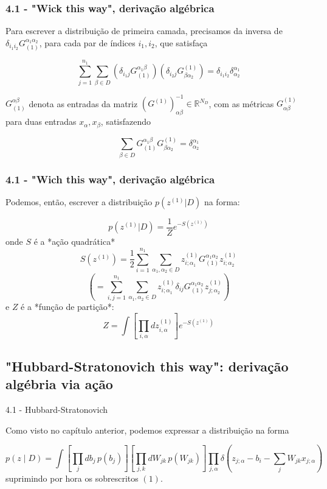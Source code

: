 \documentclass{beamer}
\begin{document}
\begin{frame}
    \frametitle{4.1 - "Wick this way", derivação algébrica}

    Para escrever a distribuição de primeira camada, precisamos da inversa de  $\delta_{i_1i_2}G_{(1)}^{\alpha_1\alpha_2}$, para cada par de índices $i_1,i_2$, que satisfaça \pause

    $$
    \sum_{j=1}^{n_1} \sum_{\beta \in D} (\delta_{i_1 j} G^{\alpha_1 \beta}_{(1)})(\delta_{i_2 j} G_{\beta \alpha_2}^{(1)}) = \delta_{i_1i_2}\delta^{\alpha_1}_{\alpha_2}
    $$
    \pause

    $G^{\alpha \beta}_{(1)}$ denota as entradas da matriz $(G^{(1)})^{-1}_{\alpha \beta} \in \mathbb R^{N_D}$, com as métricas $G^{(1)}_{\alpha\beta}$ para duas entradas ${x_\alpha}, {x_\beta}$, satisfazendo

    $$
    \sum_{\beta \in D} G^{\alpha_1 \beta}_{(1)}G_{\beta \alpha_2}^{(1)} = \delta^{\alpha_1}_{\alpha_2}
    $$

\end{frame}

\begin{frame}
    \frametitle{4.1 - "Wich this way", derivação algébrica}

    Podemos, então, escrever a distribuição $p(z^{(1)}|D)$ na forma:

    $$
    p(z^{(1)}|D) = \frac{1}{Z} e^{-S(z^{(1)})}
    $$
    onde \pause $S$ é a *ação quadrática*
    $$
    S(z^{(1)}) = \frac{1}{2} \sum_{i=1}^{n_1} \sum_{\alpha_1,\alpha_2 \in D} z^{(1)}_{i;\alpha_1} G^{\alpha_1 \alpha_2}_{(1)} z^{(1)}_{i;\alpha_2}
    $$
    \pause
    $$
    \left(=\sum_{i,j=1}^{n_1} \sum_{\alpha_1,\alpha_2 \in D} z^{(1)}_{i;\alpha_1} \delta_{ij} G^{\alpha_1 \alpha_2}_{(1)} z^{(1)}_{j;\alpha_2} \right)
    $$
    \pause
    e $Z$ é a *função de partição*:
    $$
    Z = \int \left[ \prod_{i,\alpha} dz_{i,\alpha}^{(1)} \right] e^{-S(z^{(1)})}
    $$
\end{frame}

\subsection{"Hubbard-Stratonovich this way": derivação algébria via ação}
\begin{frame}
\tableofcontents[currentsubsection]
\end{frame}

\begin{frame}{4.1 - Hubbard-Stratonovich}
    
    Como visto no capítulo anterior, podemos expressar a distribuição na forma

    \footnotesize
    $$
    p(z \mid D) = \int \left[ \prod_j db_j \, p(b_j) \right] 
    \left[ \prod_{j,k} dW_{jk} \, p(W_{jk}) \right] 
    \prod_{j,\alpha} \delta \left( z_{j;\alpha} - b_i - \sum_j W_{jk} x_{j;\alpha} \right)
    $$
    \normalsize
    suprimindo por hora os sobrescritos $(1)$.
\end{frame}
\end{document}
